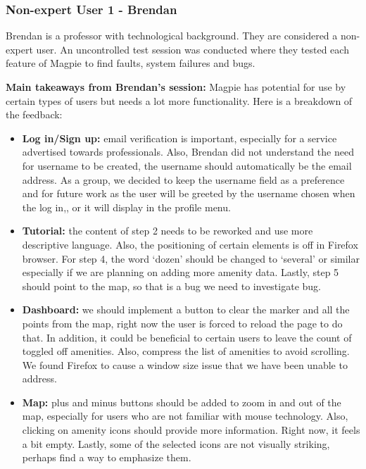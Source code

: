 \subsubsection{Non-expert User 1 - Brendan}
Brendan is a professor with technological background. They are considered a
non-expert user. An uncontrolled test session was conducted where they tested
each feature of Magpie to find faults, system failures and bugs.

\textbf{Main takeaways from Brendan's session: }Magpie has potential for use by
certain types of users but needs a lot more functionality. Here is a breakdown
of the feedback:
\begin{itemize}
    \item \textbf{Log in/Sign up: } email verification is important, especially
          for a service advertised towards professionals. Also, Brendan did not
          understand the need for username to be created, the username should
          automatically be the email address. As a group, we decided to keep the
          username field as a preference and for future work as the user will be
          greeted by the username chosen when the log in,, or it will display in the
          profile menu.
          \vspace{0.2cm}
          
    \item \textbf{Tutorial: }the content of step 2 needs to be reworked and use
          more descriptive language. Also, the positioning of certain elements is off
          in Firefox browser. For step 4, the word `dozen' should be changed to
          `several' or similar especially if we are planning on adding more amenity
          data. Lastly, step 5 should point to the map, so that is a bug we need to
          investigate bug.
          \vspace{0.2cm}
          
    \item \textbf{Dashboard: }we should implement a button to clear the marker
          and all the points from the map, right now the user is forced to reload the
          page to do that. In addition, it could be beneficial to certain users to
          leave the count of toggled off amenities. Also, compress the list of
          amenities to avoid scrolling. We found Firefox to cause a window size
          issue that we have been unable to address.
          \vspace{0.2cm}
          
    \item \textbf{Map: } plus and minus buttons should be added to zoom in and
          out of the map, especially for users who are not familiar with mouse
          technology. Also, clicking on amenity icons should provide more information.
          Right now, it feels a bit empty. Lastly, some of the selected icons are not
          visually striking, perhaps find a way to emphasize them.
          \vspace{0.2cm}
          

\end{itemize}
